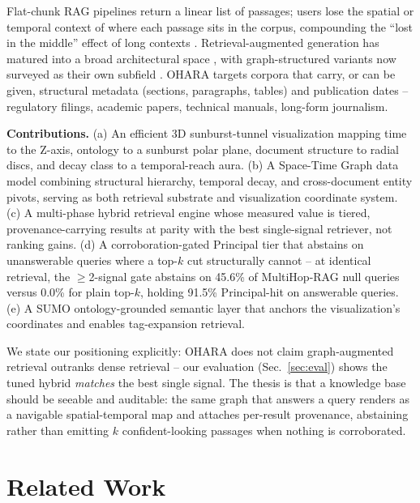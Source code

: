 \documentclass[conference,a4paper]{IEEEtran}
\begin{document}
Flat-chunk RAG pipelines return a linear list of passages; users lose the spatial or temporal context of where each passage sits in the corpus, compounding the ``lost in the middle'' effect of long contexts \cite{liu2024lost}. Retrieval-augmented generation has matured into a broad architectural space \cite{gao2023ragsurvey}, with graph-structured variants now surveyed as their own subfield \cite{peng2024graphrag_survey}. OHARA targets corpora that carry, or can be given, structural metadata (sections, paragraphs, tables) and publication dates -- regulatory filings, academic papers, technical manuals, long-form journalism.

\textbf{Contributions.} (a) An efficient 3D sunburst-tunnel visualization mapping time to the Z-axis, ontology to a sunburst polar plane, document structure to radial discs, and decay class to a temporal-reach aura. (b) A Space-Time Graph data model combining structural hierarchy, temporal decay, and cross-document entity pivots, serving as both retrieval substrate and visualization coordinate system. (c) A multi-phase hybrid retrieval engine whose measured value is tiered, provenance-carrying results at parity with the best single-signal retriever, not ranking gains. (d) A corroboration-gated Principal tier that abstains on unanswerable queries where a top-$k$ cut structurally cannot -- at identical retrieval, the $\geq$2-signal gate abstains on 45.6\% of MultiHop-RAG null queries versus 0.0\% for plain top-$k$, holding 91.5\% Principal-hit on answerable queries. (e) A SUMO ontology-grounded semantic layer that anchors the visualization's coordinates and enables tag-expansion retrieval.

We state our positioning explicitly: OHARA does not claim graph-augmented retrieval outranks dense retrieval -- our evaluation (Sec.~\ref{sec:eval}) shows the tuned hybrid \emph{matches} the best single signal. The thesis is that a knowledge base should be seeable and auditable: the same graph that answers a query renders as a navigable spatial-temporal map and attaches per-result provenance, abstaining rather than emitting $k$ confident-looking passages when nothing is corroborated.

\section{Related Work}
\end{document}

